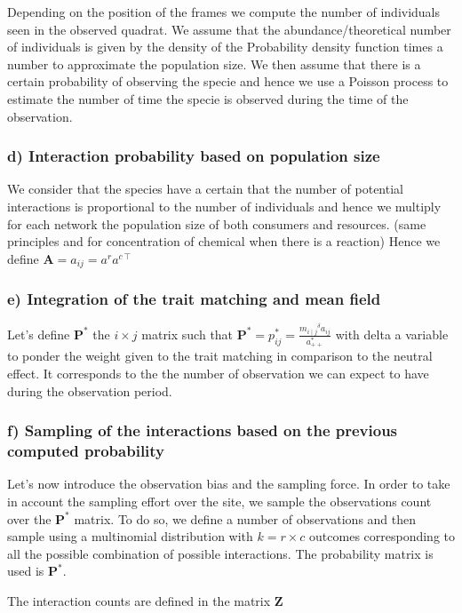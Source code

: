 \documentclass{article}
\begin{document}
Depending on the position of the frames we compute the number of individuals seen in the observed quadrat. We assume that the abundance/theoretical number of individuals is given by the density of the Probability density function times a number to approximate the population size. We then assume that there is a certain probability of observing the specie and hence we use a Poisson process to estimate the number of time the specie is observed during the time of the observation.


\subsubsection{d) Interaction probability based on population size}
We consider that the species have a certain that the number of potential interactions is proportional to the number of individuals and hence we multiply for each network the population size of both consumers and resources. (same principles and for concentration of chemical when there is a reaction)
Hence we define $\textbf{A} = a_{ij} = a^r a^{c\intercal}$




\subsubsection{e) Integration of the trait matching and mean field}
Let's define $\textbf{P}^*$ the $i \times j$ matrix such that $\textbf{P}^* = p^*_{ij} = \frac{{m_{i\mid j}}^\delta a_{ij}}{a_{++}^*}$ with delta a variable to ponder the weight given to the trait matching in comparison to the neutral effect.
It corresponds to the the number of observation we can expect to have during the observation period.




\subsubsection{f) Sampling of the interactions based on the previous computed probability}
Let's now introduce the observation bias and the sampling force. In order to take in account the sampling effort over the site, we sample the observations count over the $\textbf{P}^*$ matrix. To do so, we define a number of observations and then sample using a multinomial distribution with $k = r \times c$ outcomes corresponding to all the possible combination of possible interactions. The probability matrix is used is $\textbf{P}^*$.

The interaction counts are defined in the matrix $\textbf{Z}$
\end{document}
